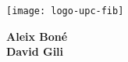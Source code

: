 
\thispagestyle{empty}
\clearpage
\setcounter{page}{-1}

\makeatletter
\begin{titlepage}
{
    \centering
    \texttt{[image: logo-upc-fib]}
    \null%
    \vspace{3em}
    {\Huge \bfseries \@title{} \par}
    \vspace{2em}
    \vspace{3em}
    {\large \scshape \@date{} \par}

    \vfill
    {\raggedleft{} \large \bfseries
    Aleix Boné \\
    David Gili
    \par}
    \vspace{1em}
    \null%
}
\end{titlepage}
\makeatother
